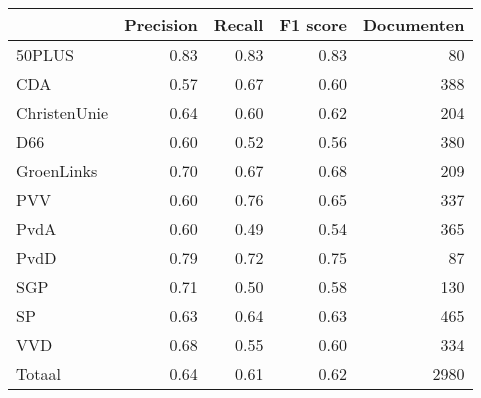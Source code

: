 \begin{tabular}{lrrrr}
\toprule
{} &  Precision &  Recall &  F1 score &  Documenten \\
\midrule
50PLUS       &       0.83 &    0.83 &      0.83 &          80 \\
CDA          &       0.57 &    0.67 &      0.60 &         388 \\
ChristenUnie &       0.64 &    0.60 &      0.62 &         204 \\
D66          &       0.60 &    0.52 &      0.56 &         380 \\
GroenLinks   &       0.70 &    0.67 &      0.68 &         209 \\
PVV          &       0.60 &    0.76 &      0.65 &         337 \\
PvdA         &       0.60 &    0.49 &      0.54 &         365 \\
PvdD         &       0.79 &    0.72 &      0.75 &          87 \\
SGP          &       0.71 &    0.50 &      0.58 &         130 \\
SP           &       0.63 &    0.64 &      0.63 &         465 \\
VVD          &       0.68 &    0.55 &      0.60 &         334 \\
Totaal       &       0.64 &    0.61 &      0.62 &        2980 \\
\bottomrule
\end{tabular}
